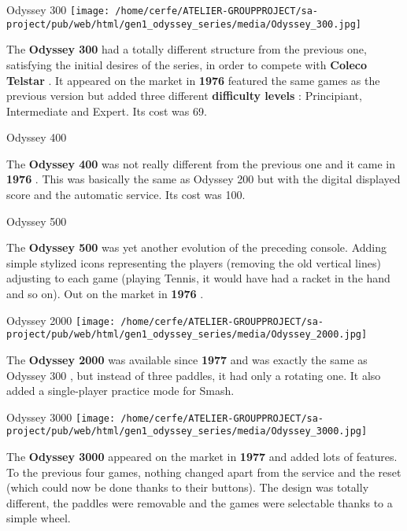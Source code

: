 \documentclass[a4paper,10pt]{book}
\begin{document}
 
 Odyssey 300 
 \texttt{[image: /home/cerfe/ATELIER-GROUPPROJECT/sa-project/pub/web/html/gen1\_odyssey\_series/media/Odyssey\_300.jpg]}
 
          The  \textbf{Odyssey 300 }  had a totally different structure from the previous one, satisfying the
          initial desires of the series, in order to compete with  \textbf{Coleco Telstar } .
          It appeared on the market in  \textbf{1976 }  featured the same games as the previous version but added
          three different  \textbf{difficulty levels } : Principiant, Intermediate and Expert.  
          Its cost was 69.
         
 
 Odyssey 400 
 
          The  \textbf{Odyssey 400 }  was not really different from the previous one and it came in  \textbf{1976 } .
          This was basically the same as  Odyssey 200  but with the digital displayed score
          and the automatic service.  
          Its cost was 100.
         
 Odyssey 500 
 
          The  \textbf{Odyssey 500 }  was yet another evolution of the preceding console. Adding simple stylized icons
          representing the players (removing the old vertical lines) adjusting to each game (playing Tennis, it would have had
          a racket in the hand and so on).  
          Out on the market in  \textbf{1976 } .
         
 
 Odyssey 2000 
 \texttt{[image: /home/cerfe/ATELIER-GROUPPROJECT/sa-project/pub/web/html/gen1\_odyssey\_series/media/Odyssey\_2000.jpg]}
 
          The  \textbf{Odyssey 2000 }  was available since  \textbf{1977 }  and was exactly the same as
           Odyssey 300 , but instead of three paddles, it had only a rotating one. It also added a
          single-player practice mode for Smash.  
 
 
 Odyssey 3000 
 \texttt{[image: /home/cerfe/ATELIER-GROUPPROJECT/sa-project/pub/web/html/gen1\_odyssey\_series/media/Odyssey\_3000.jpg]}
 
          The  \textbf{Odyssey 3000 }  appeared on the market in  \textbf{1977 }  and added lots of features.
          To the previous four games, nothing changed apart from the service and the reset
          (which could now be done thanks to their buttons). The design was totally different, the paddles were removable
          and the games were selectable thanks to a simple wheel.  
 
\end{document}
